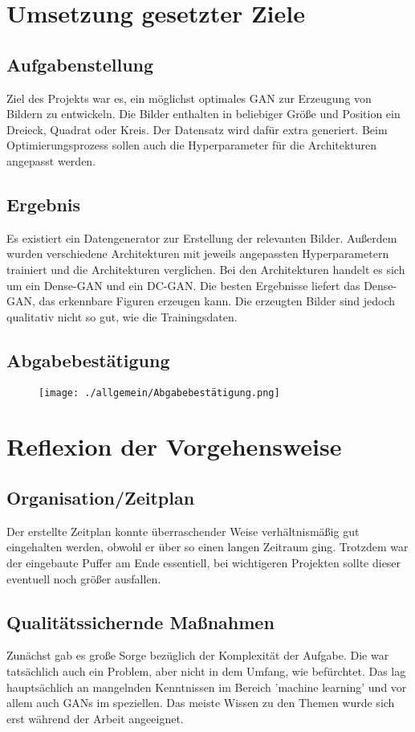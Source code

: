 
\newcommand{\Titel}{Abschlussbericht}


\section{Umsetzung gesetzter Ziele}
\subsection{Aufgabenstellung}
Ziel des Projekts war es, ein möglichst optimales GAN zur Erzeugung von Bildern zu entwickeln.
Die Bilder enthalten in beliebiger Größe und Position ein Dreieck, Quadrat oder Kreis.
Der Datensatz wird dafür extra generiert.
Beim Optimierungsprozess sollen auch die Hyperparameter für die Architekturen angepasst werden.
\subsection{Ergebnis}
Es existiert ein Datengenerator zur Erstellung der relevanten Bilder.
Außerdem wurden verschiedene Architekturen mit jeweils angepassten Hyperparametern trainiert und die Architekturen verglichen.
Bei den Architekturen handelt es sich um ein Dense-GAN und ein DC-GAN.
Die besten Ergebnisse liefert das Dense-GAN, das erkennbare Figuren erzeugen kann.
Die erzeugten Bilder sind jedoch qualitativ nicht so gut, wie die Trainingsdaten.
\subsection{Abgabebestätigung}
\begin{figure}[H]
	\centering
	\texttt{[image: ./allgemein/Abgabebestätigung.png]}
\end{figure}
\section{Reflexion der Vorgehensweise}
\subsection{Organisation/Zeitplan}
Der erstellte Zeitplan konnte überraschender Weise verhältnismäßig gut eingehalten werden, obwohl er über so einen langen Zeitraum ging.
Trotzdem war der eingebaute Puffer am Ende essentiell, bei wichtigeren Projekten sollte dieser eventuell noch größer ausfallen.
\subsection{Qualitätssichernde Maßnahmen}
Zunächst gab es große Sorge bezüglich der Komplexität der Aufgabe.
Die war tatsächlich auch ein Problem, aber nicht in dem Umfang, wie befürchtet.
Das lag hauptsächlich an mangelnden Kenntnissen im Bereich 'machine learning' und vor allem auch GANs im speziellen.
Das meiste Wissen zu den Themen wurde sich erst während der Arbeit angeeignet.
\newline


